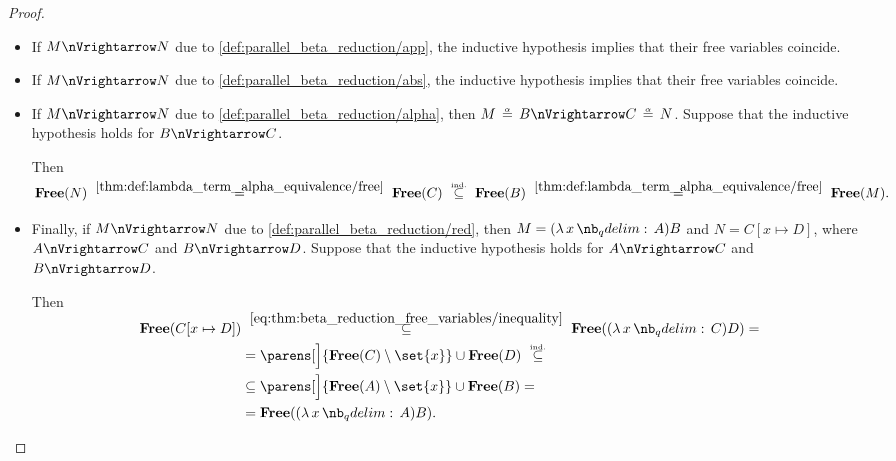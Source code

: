 \begin{proof}
\begin{itemize}
    \item If \( M \pred N \) due to \ref{def:parallel_beta_reduction/app}, the inductive hypothesis implies that their free variables coincide.

    \item If \( M \pred N \) due to \ref{def:parallel_beta_reduction/abs}, the inductive hypothesis implies that their free variables coincide.

    \item If \( M \pred N \) due to \ref{def:parallel_beta_reduction/alpha}, then \( M \aequiv B \pred C \aequiv N \). Suppose that the inductive hypothesis holds for \( B \pred C \).

    Then
    \begin{equation*}
      \op*{Free}(N)
      \reloset {\ref{thm:def:lambda_term_alpha_equivalence/free}} =
      \op*{Free}(C)
      \reloset {\T{ind.}} \subseteq
      \op*{Free}(B)
      \reloset {\ref{thm:def:lambda_term_alpha_equivalence/free}} =
      \op*{Free}(M).
    \end{equation*}

    \item Finally, if \( M \pred N \) due to \ref{def:parallel_beta_reduction/red}, then \( M = (\qabs x A)B \) and \( N = C[x \mapsto D] \), where \( A \pred C \) and \( B \pred D \). Suppose that the inductive hypothesis holds for \( A \pred C \) and \( B \pred D \).

    Then
    \begin{align*}
      \op*{Free}(C[x \mapsto D])
      &\reloset {\eqref{eq:thm:beta_reduction_free_variables/inequality}} \subseteq
      \op*{Free}((\qabs x C) D)
      = \\ &=
      \parens[\Big]{ \op*{Free}(C) \setminus \set{ x } } \cup \op*{Free}(D)
      \reloset {\T{ind.}} \subseteq \\ &\subseteq
      \parens[\Big]{ \op*{Free}(A) \setminus \set{ x } } \cup \op*{Free}(B)
      = \\ &=
      \op*{Free}((\qabs x A) B).
    \end{align*}
  \end{itemize}
\end{proof}


